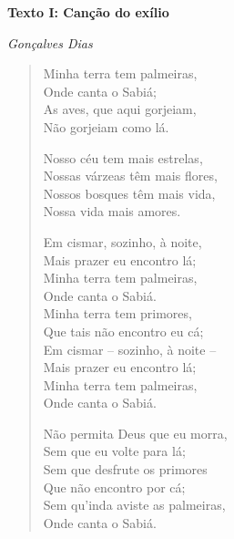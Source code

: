 \begin{myquote}

\textbf{Texto I: Canção do exílio}

\emph{Gonçalves Dias}

\begin{verse}

Minha terra tem palmeiras, \\

Onde canta o Sabiá; \\

As aves, que aqui gorjeiam, \\

Não gorjeiam como lá. 


Nosso céu tem mais estrelas,\\

Nossas várzeas têm mais flores, \\

Nossos bosques têm mais vida, \\

Nossa vida mais amores.


Em cismar, sozinho, à noite, \\

Mais prazer eu encontro lá; \\

Minha terra tem palmeiras, \\

Onde canta o Sabiá. \\


Minha terra tem primores, \\

Que tais não encontro eu cá; \\

Em cismar -- sozinho, à noite -- \\

Mais prazer eu encontro lá; \\

Minha terra tem palmeiras, \\

Onde canta o Sabiá. 


Não permita Deus que eu morra, \\

Sem que eu volte para lá; \\

Sem que desfrute os primores \\

Que não encontro por cá; \\

Sem qu'inda aviste as palmeiras, \\

Onde canta o Sabiá.

\end{verse}


\end{myquote}

